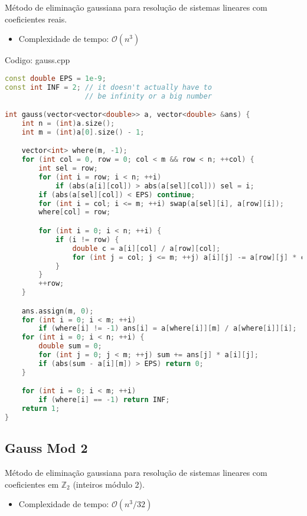 \documentclass[10pt, a4paper, oneside]{book}
\begin{document}
Método de eliminação gaussiana para resolução de sistemas lineares com coeficientes reais.



\begin{itemize}
\item Complexidade de tempo: $\mathcal{O}(n^3)$
\end{itemize}

\hfill

Codigo: gauss.cpp

\begin{lstlisting}[language=C++]
const double EPS = 1e-9;
const int INF = 2; // it doesn't actually have to
                   // be infinity or a big number

int gauss(vector<vector<double>> a, vector<double> &ans) {
    int n = (int)a.size();
    int m = (int)a[0].size() - 1;

    vector<int> where(m, -1);
    for (int col = 0, row = 0; col < m && row < n; ++col) {
        int sel = row;
        for (int i = row; i < n; ++i)
            if (abs(a[i][col]) > abs(a[sel][col])) sel = i;
        if (abs(a[sel][col]) < EPS) continue;
        for (int i = col; i <= m; ++i) swap(a[sel][i], a[row][i]);
        where[col] = row;

        for (int i = 0; i < n; ++i) {
            if (i != row) {
                double c = a[i][col] / a[row][col];
                for (int j = col; j <= m; ++j) a[i][j] -= a[row][j] * c;
            }
        }
        ++row;
    }

    ans.assign(m, 0);
    for (int i = 0; i < m; ++i)
        if (where[i] != -1) ans[i] = a[where[i]][m] / a[where[i]][i];
    for (int i = 0; i < n; ++i) {
        double sum = 0;
        for (int j = 0; j < m; ++j) sum += ans[j] * a[i][j];
        if (abs(sum - a[i][m]) > EPS) return 0;
    }

    for (int i = 0; i < m; ++i)
        if (where[i] == -1) return INF;
    return 1;
}
\end{lstlisting}
\hfill

\subsection{Gauss Mod 2}


Método de eliminação gaussiana para resolução de sistemas lineares com coeficientes em $\mathbb{Z}_2$ (inteiros módulo 2).



\begin{itemize}
\item Complexidade de tempo: $\mathcal{O}(n^3/32)$
\end{itemize}
\end{document}
